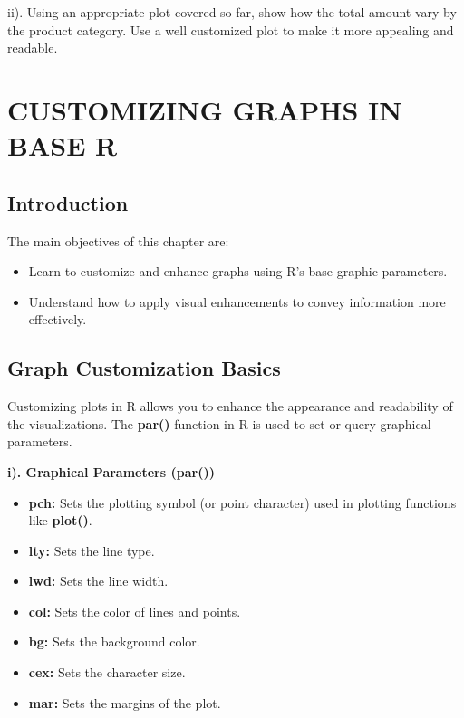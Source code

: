 \documentclass[
]{book}
\providecommand{\tightlist}{%
  \setlength{\itemsep}{0pt}\setlength{\parskip}{0pt}}
\begin{document}
ii). Using an appropriate plot covered so far, show how the total amount vary by the product category. Use a well customized plot to make it more appealing and readable.

\chapter{CUSTOMIZING GRAPHS IN BASE R}\label{customizing-graphs-in-base-r}

\section{Introduction}\label{introduction-2}

The main objectives of this chapter are:

\begin{itemize}
\tightlist
\item
  Learn to customize and enhance graphs using R's base graphic parameters.
\item
  Understand how to apply visual enhancements to convey information more
  effectively.
\end{itemize}

\section{Graph Customization Basics}\label{graph-customization-basics}

Customizing plots in R allows you to enhance the appearance and readability of the visualizations. The \textbf{par()} function in R is used to set or query graphical parameters.

\textbf{i). Graphical Parameters (par())}

\begin{itemize}
\tightlist
\item
  \textbf{pch:} Sets the plotting symbol (or point character) used in plotting functions like \textbf{plot()}.
\item
  \textbf{lty:} Sets the line type.
\item
  \textbf{lwd:} Sets the line width.
\item
  \textbf{col:} Sets the color of lines and points.
\item
  \textbf{bg:} Sets the background color.
\item
  \textbf{cex:} Sets the character size.
\item
  \textbf{mar:} Sets the margins of the plot.
\end{itemize}
\end{document}
